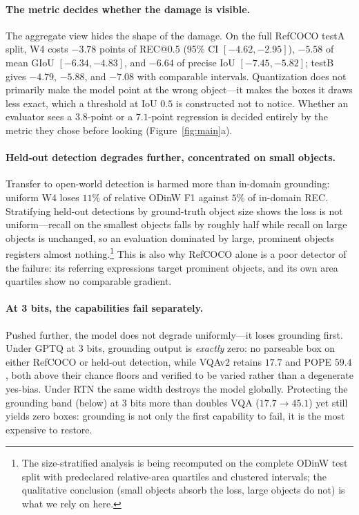 \documentclass[letterpaper]{article} %
\begin{document}
\paragraph{The metric decides whether the damage is visible.} The aggregate view hides the shape of the damage. On the full RefCOCO testA split, W4 costs $-3.78$ points of REC@0.5 (95\% CI $[-4.62, -2.95]$), $-5.58$ of mean GIoU $[-6.34, -4.83]$, and $-6.64$ of precise IoU $[-7.45, -5.82]$; testB gives $-4.79$, $-5.88$, and $-7.08$ with comparable intervals. Quantization does not primarily make the model point at the wrong object---it makes the boxes it draws less exact, which a threshold at IoU $0.5$ is constructed not to notice. Whether an evaluator sees a $3.8$-point or a $7.1$-point regression is decided entirely by the metric they chose before looking (Figure~\ref{fig:main}a).

\paragraph{Held-out detection degrades further, concentrated on small objects.} Transfer to open-world detection is harmed more than in-domain grounding: uniform W4 loses $11\%$ of relative ODinW F1 against $5\%$ of in-domain REC. Stratifying held-out detections by ground-truth object size shows the loss is not uniform---recall on the smallest objects falls by roughly half while recall on large objects is unchanged, so an evaluation dominated by large, prominent objects registers almost nothing.\footnote{The size-stratified analysis is being recomputed on the complete ODinW test split with predeclared relative-area quartiles and clustered intervals; the qualitative conclusion (small objects absorb the loss, large objects do not) is what we rely on here.} This is also why RefCOCO alone is a poor detector of the failure: its referring expressions target prominent objects, and its own area quartiles show no comparable gradient.

\paragraph{At 3 bits, the capabilities fail separately.} Pushed further, the model does not degrade uniformly---it loses grounding first. Under GPTQ at 3 bits, grounding output is \emph{exactly} zero: no parseable box on either RefCOCO or held-out detection, while VQAv2 retains $17.7$ and POPE $59.4$, both above their chance floors and verified to be varied rather than a degenerate yes-bias. Under RTN the same width destroys the model globally. Protecting the grounding band (below) at 3 bits more than doubles VQA ($17.7 \to 45.1$) yet still yields zero boxes: grounding is not only the first capability to fail, it is the most expensive to restore.
\end{document}
